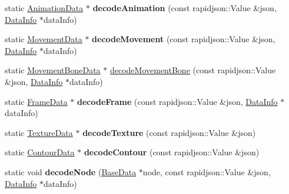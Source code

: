 \begin{DoxyCompactItemize}
\mbox{\label{classcocostudio_1_1DataReaderHelper_a2ac541955a176836a7c1958c1c658666}} 
static \hyperlink{classcocostudio_1_1AnimationData}{Animation\+Data} $\ast$ {\bfseries decode\+Animation} (const rapidjson\+::\+Value \&json, \hyperlink{structcocostudio_1_1DataReaderHelper_1_1__DataInfo}{Data\+Info} $\ast$data\+Info)
\item 
\mbox{\label{classcocostudio_1_1DataReaderHelper_a85d2bf12c873f09412af3dd50dde5d62}} 
static \hyperlink{classcocostudio_1_1MovementData}{Movement\+Data} $\ast$ {\bfseries decode\+Movement} (const rapidjson\+::\+Value \&json, \hyperlink{structcocostudio_1_1DataReaderHelper_1_1__DataInfo}{Data\+Info} $\ast$data\+Info)
\item 
static \hyperlink{classcocostudio_1_1MovementBoneData}{Movement\+Bone\+Data} $\ast$ \hyperlink{classcocostudio_1_1DataReaderHelper_aee6903dd300cad7e2a5026efb81c07e3}{decode\+Movement\+Bone} (const rapidjson\+::\+Value \&json, \hyperlink{structcocostudio_1_1DataReaderHelper_1_1__DataInfo}{Data\+Info} $\ast$data\+Info)
\item 
\mbox{\label{classcocostudio_1_1DataReaderHelper_aa672d709433c90a21715d22649f8823b}} 
static \hyperlink{classcocostudio_1_1FrameData}{Frame\+Data} $\ast$ {\bfseries decode\+Frame} (const rapidjson\+::\+Value \&json, \hyperlink{structcocostudio_1_1DataReaderHelper_1_1__DataInfo}{Data\+Info} $\ast$data\+Info)
\item 
\mbox{\label{classcocostudio_1_1DataReaderHelper_a984b0381498cd20b9c9f5b6ad9d1da44}} 
static \hyperlink{classcocostudio_1_1TextureData}{Texture\+Data} $\ast$ {\bfseries decode\+Texture} (const rapidjson\+::\+Value \&json)
\item 
\mbox{\label{classcocostudio_1_1DataReaderHelper_acb6c7958e6101e9d3f3398cadaeb63e2}} 
static \hyperlink{classcocostudio_1_1ContourData}{Contour\+Data} $\ast$ {\bfseries decode\+Contour} (const rapidjson\+::\+Value \&json)
\item 
\mbox{\label{classcocostudio_1_1DataReaderHelper_a213a12d780136c416d1b1aa73e55a827}} 
static void {\bfseries decode\+Node} (\hyperlink{classcocostudio_1_1BaseData}{Base\+Data} $\ast$node, const rapidjson\+::\+Value \&json, \hyperlink{structcocostudio_1_1DataReaderHelper_1_1__DataInfo}{Data\+Info} $\ast$data\+Info)

\end{DoxyCompactItemize}
